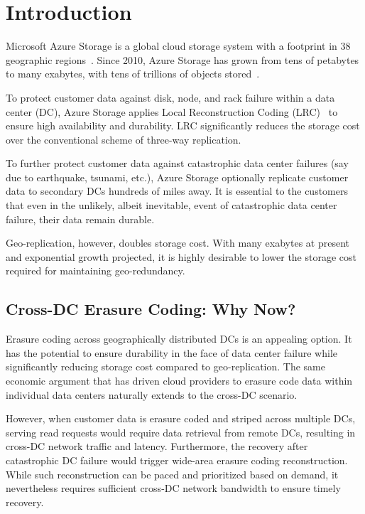\section{Introduction}

Microsoft Azure Storage is a global cloud storage system with a footprint in 38 geographic
regions~\cite{bib:azureregions}. Since 2010, Azure Storage has grown from tens of
petabytes to many exabytes, with tens of trillions of objects stored~\cite{greenberg15sdn}.

To protect customer data against disk, node, and rack failure within a data
center (DC), Azure Storage applies Local Reconstruction Coding (LRC)~\cite{huang12erasure}
to ensure high availability and durability. 
LRC significantly reduces the storage cost over the conventional scheme of
three-way replication.

To further protect customer data against catastrophic data center failures
(say due to earthquake, tsunami, etc.),
Azure Storage optionally replicate customer data to secondary DCs hundreds of miles away.
It is essential to the customers that even in the unlikely, albeit inevitable,
event of catastrophic data center failure, their data remain durable.

Geo-replication, however, doubles storage cost.
With many exabytes at present and exponential growth projected,
it is highly desirable to lower the storage cost
required for maintaining geo-redundancy.



\subsection{Cross-DC Erasure Coding: Why Now?}

Erasure coding across geographically distributed DCs is an appealing option.
It has the potential to ensure durability in the face of data center failure
while significantly reducing storage cost compared to geo-replication.
The same economic argument that has driven cloud providers to erasure code data
within individual data centers naturally extends to the cross-DC scenario.

However, when customer data is erasure coded and striped across multiple DCs, 
serving read requests would require data retrieval from remote DCs, resulting in
cross-DC network traffic and latency. Furthermore, the recovery after catastrophic
DC failure would trigger wide-area erasure coding reconstruction. While such
reconstruction can be paced and prioritized based on demand, it nevertheless
requires sufficient cross-DC network bandwidth to ensure timely recovery.

